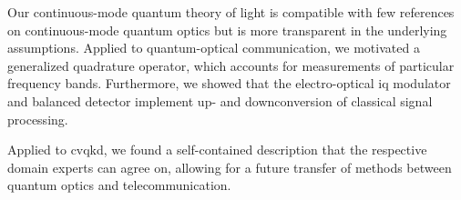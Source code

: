 Our continuous-mode quantum theory of light is compatible with few references on continuous-mode quantum optics but is more transparent in the underlying assumptions.
Applied to quantum-optical communication, we motivated a generalized quadrature operator, which accounts for measurements of particular frequency bands.
Furthermore, we showed that the electro-optical \gls{iq} modulator and balanced detector implement up- and downconversion of classical signal processing.

Applied to \gls{cvqkd}, we found a self-contained description that the respective domain experts can agree on, allowing for a future transfer of methods between quantum optics and telecommunication.